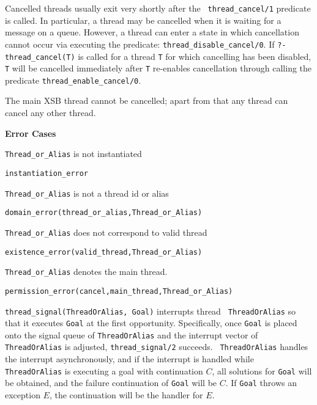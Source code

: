 \begin{description}
Cancelled threads usually exit very shortly after the {\tt
  thread\_cancel/1} predicate is called.  In particular, a thread may
be cancelled when it is waiting for a message on a queue.  However, a
thread can enter a state in which cancellation cannot occur via
executing the predicate: {\tt thread\_disable\_cancel/0}.  If {\tt ?-
  thread\_cancel(T)} is called for a thread {\tt T} for which
cancelling has been disabled, {\tt T} will be cancelled immediately
after {\tt T} re-enables cancellation through calling the predicate
{\tt thread\_enable\_cancel/0}.

The main XSB thread cannot be cancelled; apart from that any thread
can cancel any other thread.

{\bf Error Cases}
\bi
\item 	{\tt Thread\_or\_Alias} is not instantiated
\bi
\item 	{\tt instantiation\_error}
\ei
%
\item 	{\tt Thread\_or\_Alias} is not a thread id or alias
\bi
\item 	{\tt domain\_error(thread\_or\_alias,Thread\_or\_Alias)}
\ei
%
\item   {\tt Thread\_or\_Alias} does not correspond to valid thread
\bi
\item   {\tt existence\_error(valid\_thread,Thread\_or\_Alias)}
\ei
\item   {\tt Thread\_or\_Alias} denotes the main thread.
\bi
\item   {\tt permission\_error(cancel,main\_thread,Thread\_or\_Alias)}
\ei
\ei

% 
{\tt thread\_signal(ThreadOrAlias, Goal)} interrupts thread {\tt
  ThreadOrAlias} so that it executes {\tt Goal} at the first
opportunity.  Specifically, once {\tt Goal} is placed onto the signal
queue of {\tt ThreadOrAlias} and the interrupt vector of {\tt
  ThreadOrAlias} is adjusted, {\tt thread\_signal/2} succeeds.  {\tt
  ThreadOrAlias} handles the interrupt asynchronously, and if the
interrupt is handled while {\tt ThreadOrAlias} is executing a goal
with continuation $C$, all solutions for {\tt Goal} will be obtained,
and the failure continuation of {\tt Goal} will be $C$.  If {\tt Goal}
throws an exception $E$, the continuation will be the handler for $E$.


\end{description}
